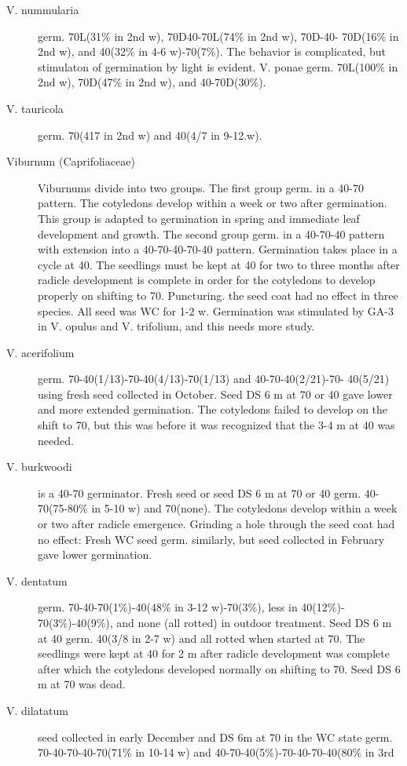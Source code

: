\begin{description}
\item[V. nummularia] germ. 70L(31\% in 2nd w), 70D40-70L(74\% in 2nd w), 70D-40-
70D(16\% in 2nd w), and 40(32\% in 4-6 w)-70(7\%). The behavior is complicated, but
stimulaton of germination by light is evident.
V. ponae germ. 70L(100\% in 2nd w), 70D(47\% in 2nd w), and 40-70D(30\%).
\item[V. tauricola] germ. 70(417 in 2nd w) and 40(4/7 in 9-12.w).

\item[Viburnum (Caprifoliaceae)] Viburnums divide into two groups. The first
group germ. in a 40-70 pattern. The cotyledons develop within a week or two after
germination. This group is adapted to germination in spring and immediate leaf
development and growth. The second group germ. in a 40-70-40 pattern with
extension into a 40-70-40-70-40 pattern. Germination takes place in a cycle at 40.
The seedlings must be kept at 40 for two to three months after radicle development is
complete in order for the cotyledons to develop properly on shifting to 70. Puncturing.
the seed coat had no effect in three species. All seed was WC for 1-2 w. Germination
was stimulated by GA-3 in V. opulus and V. trifolium, and this needs more study.
\item[V. acerifolium] germ. 70-40(1/13)-70-40(4/13)-70(1/13) and 40-70-40(2/21)-70-
40(5/21) using fresh seed collected in October. Seed DS 6 m at 70 or 40 gave lower
and more extended germination. The cotyledons failed to develop on the shift to 70,
but this was before it was recognized that the 3-4 m at 40 was needed.
\item[V. burkwoodi] is a 40-70 germinator. Fresh seed or seed DS 6 m at 70 or 40
germ. 40-70(75-80\% in 5-10 w) and 70(none). The cotyledons develop within a week
or two after radicle emergence. Grinding a hole through the seed coat had no effect:
Fresh WC seed germ. similarly, but seed collected in February gave lower
germination.
\item[V. dentatum] germ. 70-40-70(1\%)-40(48\% in 3-12 w)-70(3\%), less in 40(12\%)-
70(3\%)-40(9\%), and none (all rotted) in outdoor treatment. Seed DS 6 m at 40 germ.
40(3/8 in 2-7 w) and all rotted when started at 70. The seedlings were kept at 40 for 2
m after radicle development was complete after which the cotyledons developed
normally on shifting to 70. Seed DS 6 m at 70 was dead.
\item[V. dilatatum] seed collected in early December and DS 6m at 70 in the WC state
germ. 70-40-70-40-70(71\% in 10-14 w) and 40-70-40(5\%)-70-40-70-40(80\% in 3rd

\end{description}
